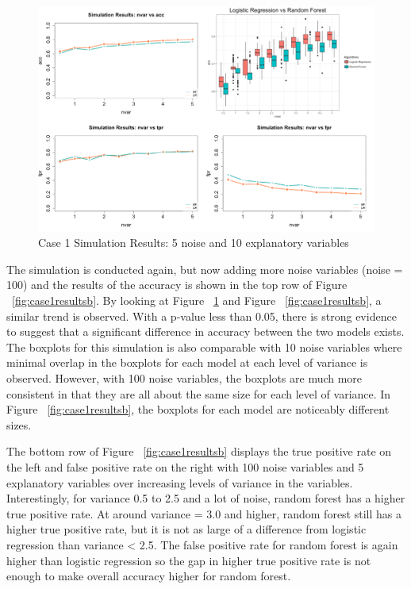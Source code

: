 \documentclass{llncs}
\begin{document}
\begin{figure}
\centering
\includegraphics[scale=0.55]{case1.png}
\caption{Case 1 Simulation Results: 5 noise and 10 explanatory variables}
\label{fig:case1results}
\end{figure}

The simulation is conducted again, but now adding more noise variables (noise = 100) and the results of the accuracy is shown in the top row of Figure ~\ref{fig:case1resultsb}. By looking at Figure ~\ref{fig:case1results} and Figure ~\ref{fig:case1resultsb}, a similar trend is observed. With a p-value less than 0.05, there is strong evidence to suggest that a significant difference in accuracy between the two models exists. The boxplots for this simulation is also comparable with 10 noise variables where minimal overlap in the boxplots for each model at each level of variance is observed. However, with 100 noise variables, the boxplots are much more consistent in that they are all about the same size for each level of variance.  In Figure ~\ref{fig:case1resultsb}, the boxplots for each model are noticeably different sizes.

The bottom row of Figure ~\ref{fig:case1resultsb} displays the true positive rate on the left and false positive rate on the right with 100 noise variables and 5 explanatory variables over increasing levels of variance in the variables. Interestingly, for variance 0.5 to 2.5 and a lot of noise, random forest has a higher true positive rate.  At around variance = 3.0 and higher, random forest still has a higher true positive rate, but it is not as large of a difference from logistic regression than variance < 2.5. The false positive rate for random forest is again higher than logistic regression so the gap in higher true positive rate is not enough to make overall accuracy higher for random forest.
\end{document}
